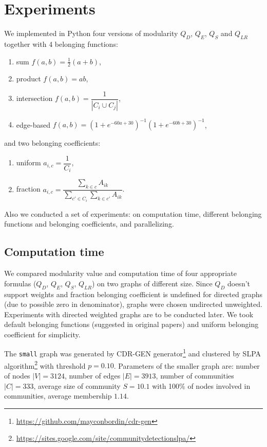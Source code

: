 \documentclass[a4paper,twocolumn]{article}
\begin{document}
\section{Experiments}

We implemented in Python four versions of modularity $Q_D$, $Q_E$, $Q_S$ and $Q_{LR}$ together with 4 belonging functions:
\begin{enumerate}\item sum $f(a,b)=\frac{1}{2}(a+b)$,
\item product $f(a,b)=ab$,
\item intersection $f(a,b)=\dfrac{1}{|C_i \cup C_j|}$,
\item edge-based $f(a,b)=(1+e^{-60a+30})^{-1}(1+e^{-60b+30})^{-1}$,
\end{enumerate}
and two belonging coefficients:
\begin{enumerate}
\item uniform $a_{i,c}=\dfrac{1}{C_i}$,
\item fraction $a_{i,c}=\dfrac{\sum_{k\in c}A_{ik}}{\sum_{c'\in C_i} \sum_{k\in c'}A_{ik} }$.
\end{enumerate}
Also we conducted a set of experiments: on computation time, different belonging functions and belonging coefficients, and parallelizing.

\subsection{Computation time}

We compared modularity value and computation time of four appropriate formulas ($Q_D$, $Q_E$, $Q_S$, $Q_{LR}$) on two graphs of different size. Since $Q_D$ doesn't support weights and fraction belonging coefficient is undefined for directed graphs (due to possible zero in denominator), graphs were chosen undirected unweighted. Experiments with directed weighted graphs are to be conducted later. We took default belonging functions (suggested in original papers) and uniform belonging coefficient for simplicity.

The \texttt{small} graph was generated by CDR-GEN generator\footnote{\url{https://github.com/mayconbordin/cdr-gen}} and clustered by SLPA algorithm\footnote{\url{https://sites.google.com/site/communitydetectionslpa/}} with threshold $p=0.10$. Parameters of the smaller graph are: number of nodes $|V|=3124$, number of edges $|E|=3913$, number of communities $|C|=333$, average size of community $S=10.1$ with 100\% of nodes involved in communities, average membership $1.14$.
\end{document}
